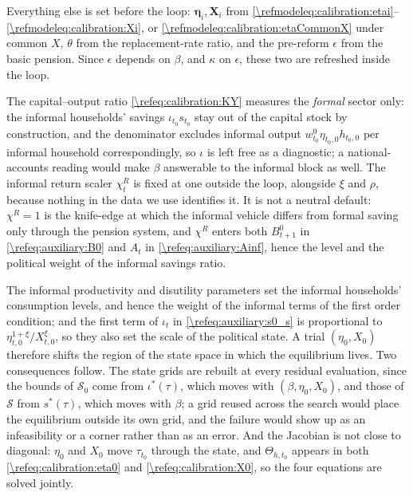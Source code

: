 Everything else is set before the loop: $\bm{\eta}_i,\bm{X}_i$ from \eqref{\refmodeleq:calibration:etai}--\eqref{\refmodeleq:calibration:Xi}, or \eqref{\refmodeleq:calibration:etaCommonX} under common $X$, $\theta$ from the replacement-rate ratio, and the pre-reform $\epsilon$ from the basic pension. Since $\epsilon$ depends on $\beta$, and $\kappa$ on $\epsilon$, these two are refreshed inside the loop.

The capital--output ratio \eqref{\refeq:calibration:KY} measures the \emph{formal} sector only: the informal households' savings $\iota_{t_0}s_{t_0}$ stay out of the capital stock by construction, and the denominator excludes informal output $w_{t_0}^0\eta_{t_0,0}h_{t_0,0}$ per informal household correspondingly, so $\iota$ is left free as a diagnostic; a national-accounts reading would make $\beta$ answerable to the informal block as well. The informal return scaler $\chi_t^R$ is fixed at one outside the loop, alongside $\xi$ and $\rho$, because nothing in the data we use identifies it. It is not a neutral default: $\chi^R = 1$ is the knife-edge at which the informal vehicle differs from formal saving only through the pension system, and $\chi^R$ enters both $B_{t+1}^0$ in \eqref{\refeq:auxiliary:B0} and $A_t$ in \eqref{\refeq:auxiliary:Ainf}, hence the level and the political weight of the informal savings ratio.

The informal productivity and disutility parameters set the informal households' consumption levels, and hence the weight of the informal terms of the first order condition; and the first term of $\iota_t$ in \eqref{\refeq:auxiliary:s0_s} is proportional to $\eta_{t,0}^{1+\xi}/X_{t,0}^{\xi}$, so they also set the scale of the political state. A trial $(\eta_0,X_0)$ therefore shifts the region of the state space in which the equilibrium lives. Two consequences follow. The state grids are rebuilt at every residual evaluation, since the bounds of $\mathcal{S}_0$ come from $\iota^*(\tau)$, which moves with $(\beta,\eta_0,X_0)$, and those of $\mathcal{S}$ from $s^*(\tau)$, which moves with $\beta$; a grid reused across the search would place the equilibrium outside its own grid, and the failure would show up as an infeasibility or a corner rather than as an error. And the Jacobian is not close to diagonal: $\eta_0$ and $X_0$ move $\tau_{t_0}$ through the state, and $\Theta_{h,t_0}$ appears in both \eqref{\refeq:calibration:eta0} and \eqref{\refeq:calibration:X0}, so the four equations are solved jointly.

